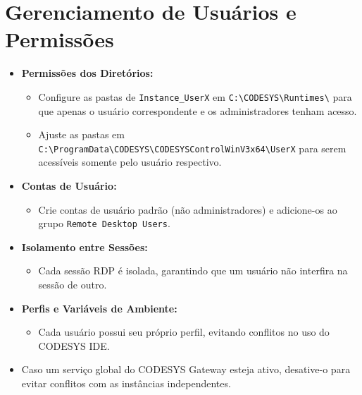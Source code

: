 \documentclass[12pt,a4paper]{article}
\begin{document}
\section{Gerenciamento de Usuários e Permissões}
\begin{itemize}[label=\textbullet]
  \item \textbf{Permissões dos Diretórios:}
    \begin{itemize}
      \item Configure as pastas de \texttt{Instance\_UserX} em \texttt{C:\textbackslash{}CODESYS\textbackslash{}Runtimes\textbackslash{}} para que apenas o usuário correspondente e os administradores tenham acesso.
      \item Ajuste as pastas em \texttt{C:\textbackslash{}ProgramData\textbackslash{}CODESYS\textbackslash{}CODESYSControlWinV3x64\textbackslash{}UserX} para serem acessíveis somente pelo usuário respectivo.
    \end{itemize}
  \item \textbf{Contas de Usuário:}
    \begin{itemize}
      \item Crie contas de usuário padrão (não administradores) e adicione-os ao grupo \texttt{Remote Desktop Users}.
    \end{itemize}
  \item \textbf{Isolamento entre Sessões:}
    \begin{itemize}
      \item Cada sessão RDP é isolada, garantindo que um usuário não interfira na sessão de outro.
    \end{itemize}
  \item \textbf{Perfis e Variáveis de Ambiente:}
    \begin{itemize}
      \item Cada usuário possui seu próprio perfil, evitando conflitos no uso do CODESYS IDE.
    \end{itemize}
  \item Caso um serviço global do CODESYS Gateway esteja ativo, desative-o para evitar conflitos com as instâncias independentes.
\end{itemize}
\end{document}
